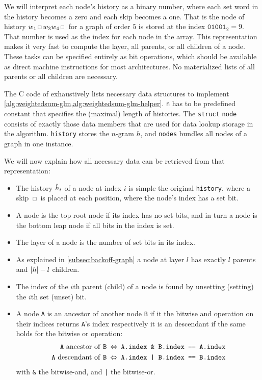 We will interpret each node's history as a binary number, where each set word
in the history becomes a zero and each skip becomes a one.
That is the node of history $w_1 \Skp w_3 w_4 \Skp$ for a graph of order $5$
is stored at the index $\texttt{01001}_2 = 9$.
That number is used as the index for each node in the array.
This representation makes it very fast to compute the layer, all parents, or
all children of a node.
These tasks can be specified entirely as bit operations, which should be
available as direct machine instructions for most architectures.
No materialized lists of all parents or all children are necessary.

The C code of  exhaustively lists necessary data
structures to implement \cref{alg:weightedsum-glm,alg:weightedsum-glm-helper}.
\texttt{n} has to be predefined constant that specifies the (maximal) length of
histories.
The \texttt{struct} \texttt{node} consists of exactly those data members that are
used for data lookup storage in the algorithm.
\texttt{history} stores the $n$-gram $h$, and \texttt{nodes} bundles all nodes
of a graph in one instance.

We will now explain how all necessary data can be retrieved from that
representation:
\begin{itemize}
  \item The history $\DerivedHistory[i]$ of a node at index $i$ is simple
    the original \texttt{history}, where a skip $\Skp$ is placed at each
    position, where the node's index has a set bit.
  \item A node is the top root node if its index has no set bits, and in turn a
    node is the bottom leap node if all bits in the index is set.
  \item The layer of a node is the number of set bits in its index.
  \item As explained in \cref{subsec:backoff-graph} a node at layer $l$ has
    exactly $l$ parents and ${\left|h\right|} - l$ children.
  \item The index of the $i$th parent (child) of a node is found by unsetting
    (setting) the $i$th set (unset) bit.
  \item A node \texttt{A} is an ancestor of another node \texttt{B}
    if it the bitwise and operation on their indices returns \texttt{A}'s index
    respectively it is an descendant if the same holds for the bitwise or
    operation:
    \begin{align*}
      \text{\texttt{A} ancestor of \texttt{B}} \: &\Leftrightarrow \: \texttt{A.index \& B.index == A.index} \\
      \text{\texttt{A} descendant of \texttt{B}} \: &\Leftrightarrow \: \texttt{A.index | B.index == B.index}
    \end{align*}
    with \texttt{\&} the bitwise-and, and \texttt{|} the bitwise-or.
\end{itemize}

